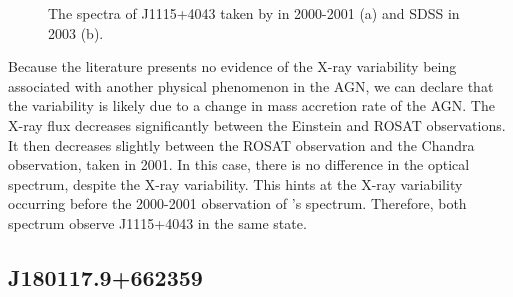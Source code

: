 \begin{figure}[h]
    \centering
    \qquad
    \caption{The spectra of J1115+4043 taken by \cite{akiyama2003} in 2000-2001 (a) and SDSS in 2003 (b). }%
    \label{fig:example}%
\end{figure}


Because the literature presents no evidence of the X-ray variability being associated with another physical phenomenon in the AGN, we can declare that the variability is likely due to a change in mass accretion rate of the AGN. 
The X-ray flux decreases significantly between the Einstein and ROSAT observations.
It then decreases slightly between the ROSAT observation and the Chandra observation, taken in 2001.
In this case, there is no difference in the optical spectrum, despite the X-ray variability.
This hints at the X-ray variability occurring before the 2000-2001 observation of \cite{akiyama2003}'s spectrum.
Therefore, both spectrum observe J1115+4043 in the same state.


\FloatBarrier




\subsection{J180117.9+662359}

